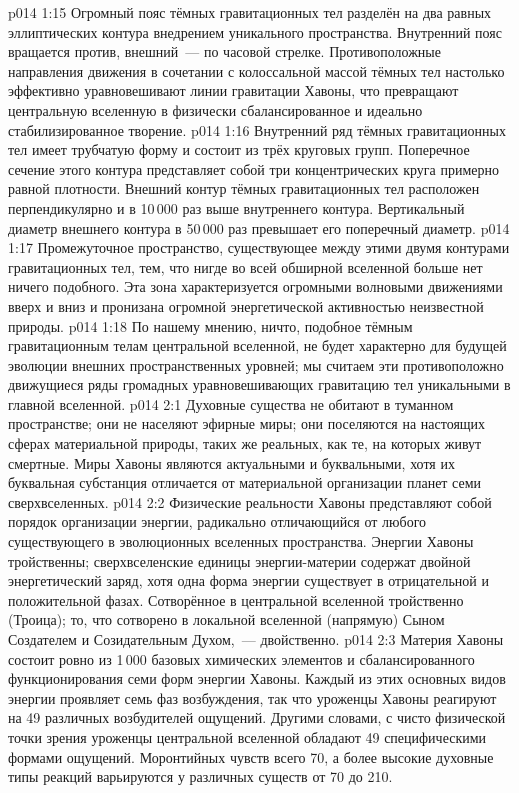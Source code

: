 \vs p014 1:15 Огромный пояс тёмных гравитационных тел разделён на два равных эллиптических контура внедрением уникального пространства. Внутренний пояс вращается против, внешний~--- по часовой стрелке. Противоположные направления движения в сочетании с колоссальной массой тёмных тел настолько эффективно уравновешивают линии гравитации Хавоны, что превращают центральную вселенную в физически сбалансированное и идеально стабилизированное творение.
\vs p014 1:16 Внутренний ряд тёмных гравитационных тел имеет трубчатую форму и состоит из трёх круговых групп. Поперечное сечение этого контура представляет собой три концентрических круга примерно равной плотности. Внешний контур тёмных гравитационных тел расположен перпендикулярно и в 10\,000 раз выше внутреннего контура. Вертикальный диаметр внешнего контура в 50\,000 раз превышает его поперечный диаметр.
\vs p014 1:17 Промежуточное пространство, существующее между этими двумя контурами гравитационных тел,  тем, что нигде во всей обширной вселенной больше нет ничего подобного. Эта зона характеризуется огромными волновыми движениями вверх и вниз и пронизана огромной энергетической активностью неизвестной природы.
\vs p014 1:18 По нашему мнению, ничто, подобное тёмным гравитационным телам центральной вселенной, не будет характерно для будущей эволюции внешних пространственных уровней; мы считаем эти противоположно движущиеся ряды громадных уравновешивающих гравитацию тел уникальными в главной вселенной.
\vs p014 2:1 Духовные существа не обитают в туманном пространстве; они не населяют эфирные миры; они поселяются на настоящих сферах материальной природы, таких же реальных, как те, на которых живут смертные. Миры Хавоны являются актуальными и буквальными, хотя их буквальная субстанция отличается от материальной организации планет семи сверхвселенных.
\vs p014 2:2 Физические реальности Хавоны представляют собой порядок организации энергии, радикально отличающийся от любого существующего в эволюционных вселенных пространства. Энергии Хавоны тройственны; сверхвселенские единицы энергии\hyp{}материи содержат двойной энергетический заряд, хотя одна форма энергии существует в отрицательной и положительной фазах. Сотворённое в центральной вселенной тройственно (Троица); то, что сотворено в локальной вселенной (напрямую) Сыном Создателем и Созидательным Духом,~--- двойственно.
\vs p014 2:3 Материя Хавоны состоит ровно из 1\,000 базовых химических элементов и сбалансированного функционирования семи форм энергии Хавоны. Каждый из этих основных видов энергии проявляет семь фаз возбуждения, так что уроженцы Хавоны реагируют на 49 различных возбудителей ощущений. Другими словами, с чисто физической точки зрения уроженцы центральной вселенной обладают 49 специфическими формами ощущений. Моронтийных чувств всего 70, а более высокие духовные типы реакций варьируются у различных существ от 70 до 210.
